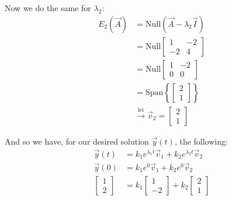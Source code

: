 \documentclass{article}
\begin{document}
Now we do the same for $\lambda_2$:
\begin{align*}
  E_2(\vec A)&=\text{Null}(\vec A-\lambda_2\vec I)\\
&=\text{Null}\begin{bmatrix} 1 & -2 \\ -2 & 4 \end{bmatrix}\\
&=\text{Null}\begin{bmatrix} 1 & -2 \\ 0 & 0 \end{bmatrix}\tag{ref}\\
&=\text{Span}\left\{\begin{bmatrix} 2\\1\end{bmatrix}\right\}\tag{$x_1=2x_2$}\\
&\stackrel{\text{let}}{\longrightarrow} \vec v_2=\begin{bmatrix} 2\\1\end{bmatrix}
\end{align*}

And so we have, for our desired solution $\vec y(t)$, the following:
\begin{align*}
  \vec y(t)&=k_1e^{\lambda_1t}\vec v_1+k_2e^{\lambda_2t}\vec v_2\tag{distinct roots}\\
  \vec y(0)&=k_1e^0\vec v_1+k_2e^0\vec v_2\tag{let $t=0$}\\
  \begin{bmatrix}
    1\\2
  \end{bmatrix}&=k_1\begin{bmatrix} 1\\-2\end{bmatrix}+k_2\begin{bmatrix} 2\\1\end{bmatrix}
\end{align*}
\end{document}
